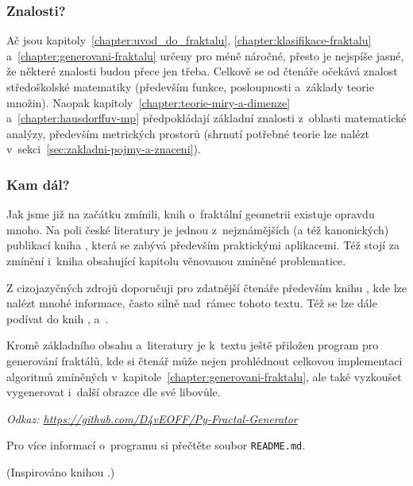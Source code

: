 \subsubsection{Znalosti?}

Ač jsou kapitoly~\ref{chapter:uvod_do_fraktalu}, \ref{chapter:klasifikace-fraktalu} a~\ref{chapter:generovani-fraktalu} určeny pro méně náročné, přesto je nejspíše jasné, že některé znalosti budou přece jen třeba. Celkově se od čtenáře očekává znalost středoškolské matematiky (především funkce, posloupnosti a~základy teorie množin). Naopak kapitoly~\ref{chapter:teorie-miry-a-dimenze} a~\ref{chapter:hausdorffuv-mp} předpokládají základní znalosti z~oblasti matematické analýzy, především metrických prostorů (shrnutí potřebné teorie lze nalézt v~sekci~\ref{sec:zakladni-pojmy-a-znaceni}).

\subsubsection{Kam dál?}

Jak jsme již na začátku zmínili, knih o~fraktální geometrii existuje opravdu mnoho. Na poli české literatury je jednou z~nejznámějších (a též kanonických) publikací kniha \cite{Zelinka2006}, která se zabývá především praktickými aplikacemi. Též stojí za zmínění i~kniha \cite{Voracova2022} obsahující kapitolu věnovanou zmíněné problematice.

Z cizojazyčných zdrojů doporučuji pro zdatnější čtenáře především knihu \cite{Falconer1989}, kde lze nalézt mnohé informace, často silně nad~rámec tohoto textu. Též se lze dále podívat do knih \cite{Prusinkiewicz1990}, \cite{Edgar2008} a~\cite{Mattila1995}.

Kromě základního obsahu a~literatury je k~textu ještě přiložen program pro generování fraktálů, kde si čtenář může nejen prohlédnout celkovou implementaci algoritmů zmíněných v~kapitole~\ref{chapter:generovani-fraktalu}, ale také vyzkoušet vygenerovat i~další obrazce dle své libovůle.

\textit{Odkaz: \url{https://github.com/D4vEOFF/Py-Fractal-Generator}}

Pro více informací o~programu si přečtěte soubor \texttt{README.md}.

(Inspirováno knihou \cite{Hladik2019}.)